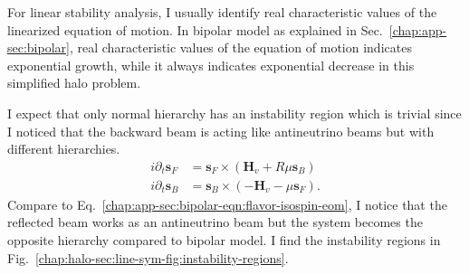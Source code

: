 For linear stability analysis, I usually identify real characteristic values of the linearized equation of motion. In bipolar model as explained in Sec.~\ref{chap:app-sec:bipolar}, real characteristic values of the equation of motion indicates exponential growth, while it always indicates exponential decrease in this simplified halo problem.

I expect that only normal hierarchy has an instability region which is trivial since I noticed that the backward beam is acting like antineutrino beams but with different hierarchies.
\begin{align}
 i \partial_t \mathbf s_F &= \mathbf s_F \times (\mathbf {H}_v +R \mu \mathbf s_B) \\
   i\partial_t \mathbf s_B &= \mathbf s_B \times (- \mathbf H_v - \mu \mathbf s_F) .
\end{align}
Compare to Eq.~\ref{chap:app-sec:bipolar-eqn:flavor-isospin-eom}, I notice that
the reflected beam works as an antineutrino beam but the system becomes the opposite hierarchy compared to bipolar model. I find the instability regions in Fig.~\ref{chap:halo-sec:line-sym-fig:instability-regions}.


